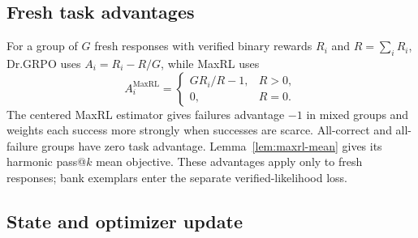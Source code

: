 \documentclass{article}
\newcommand{\1}{\mathbf 1}
\theoremstyle{remark}
\theoremstyle{definition}
\theoremstyle{plain}
\begin{document}
\subsection{Fresh task advantages}
\label{app:binary-maxrl}

For a group of $G$ fresh responses with verified binary rewards $R_i$ and
$R=\sum_i R_i$, Dr.GRPO uses $A_i=R_i-R/G$, while MaxRL uses
\[
 A_i^{\mathrm{MaxRL}}=
 \begin{cases}
 G R_i/R-1, & R>0,\\
 0, & R=0.
 \end{cases}
\]
The centered MaxRL estimator \citep{tajwar2026maxrl} gives failures advantage
$-1$ in mixed groups and weights each success more strongly when successes
are scarce. All-correct and all-failure groups have zero task advantage.
Lemma~\ref{lem:maxrl-mean} gives its harmonic pass@\(k\) mean objective.
These advantages apply only to fresh responses; bank exemplars enter the
separate verified-likelihood loss.

\subsection{State and optimizer update}
\label{app:algorithm-update}
\end{document}
